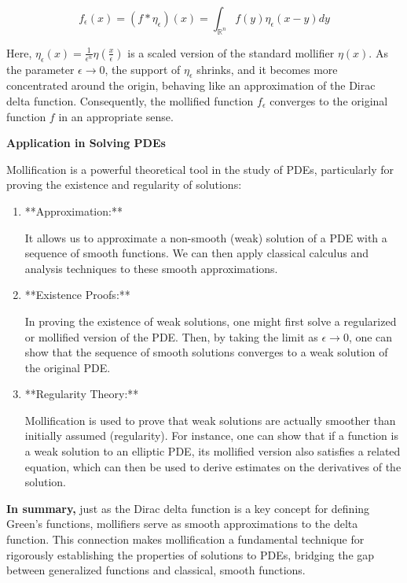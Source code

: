 \documentclass[12pt,a4paper]{report}
\begin{document}
{\begin{description}
\[ f_\epsilon(x) = (f * \eta_\epsilon)(x) = \int_{\mathbb{R}^n} f(y) \eta_\epsilon(x-y) dy \]

Here, \(\eta_\epsilon(x) = \frac{1}{\epsilon^n} \eta\left(\frac{x}{\epsilon}\right)\) is a scaled version of the standard mollifier \(\eta(x)\). As the parameter \(\epsilon \to 0\), the support of \(\eta_\epsilon\) shrinks, and it becomes more concentrated around the origin, behaving like an approximation of the Dirac delta function. Consequently, the mollified function \(f_\epsilon\) converges to the original function \(f\) in an appropriate sense.

\item \textbf{ Application in Solving PDEs}

Mollification is a powerful theoretical tool in the study of PDEs, particularly for proving the existence and regularity of solutions:

\begin{enumerate}

\item **Approximation:** 

It allows us to approximate a non-smooth (weak) solution of a PDE with a sequence of smooth functions. We can then apply classical calculus and analysis techniques to these smooth approximations.
\item  **Existence Proofs:** 

In proving the existence of weak solutions, one might first solve a regularized or mollified version of the PDE. Then, by taking the limit as \(\epsilon \to 0\), one can show that the sequence of smooth solutions converges to a weak solution of the original PDE.
\item  **Regularity Theory:** 

Mollification is used to prove that weak solutions are actually smoother than initially assumed (regularity). For instance, one can show that if a function is a weak solution to an elliptic PDE, its mollified version also satisfies a related equation, which can then be used to derive estimates on the derivatives of the solution.

\end{enumerate}

\item \textbf{In summary,} just as the Dirac delta function is a key concept for defining Green's functions, mollifiers serve as smooth approximations to the delta function. This connection makes mollification a fundamental technique for rigorously establishing the properties of solutions to PDEs, bridging the gap between generalized functions and classical, smooth functions.
\end{description}


}
\end{document}

